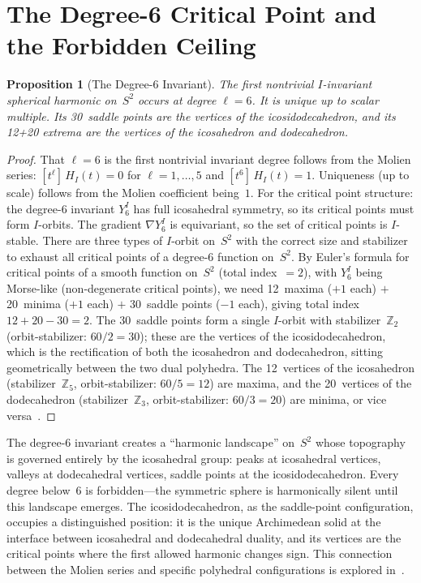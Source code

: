 \documentclass[11pt,letterpaper]{article}
\newtheorem{proposition}[theorem]{Proposition}
\theoremstyle{definition}
\newcommand{\ZZ}{\mathbb{Z}}
\begin{document}
\section{The Degree-6 Critical Point and the Forbidden Ceiling}\label{sec:critical}
\begin{proposition}[The Degree-6 Invariant]\label{prop:deg6}
The first nontrivial $I$-invariant spherical harmonic on~$S^2$ occurs at degree $\ell=6$.  It is unique up to scalar multiple.  Its 30~saddle points are the vertices of the icosidodecahedron, and its 12+20 extrema are the vertices of the icosahedron and dodecahedron.
\end{proposition}
\begin{proof}
That $\ell=6$ is the first nontrivial invariant degree follows from the Molien series: $[t^\ell]\,H_I(t)=0$ for $\ell=1,\dots,5$ and $[t^6]\,H_I(t)=1$.  Uniqueness (up to scale) follows from the Molien coefficient being~$1$.
For the critical point structure: the degree-6 invariant $Y_6^I$ has full icosahedral symmetry, so its critical points must form $I$-orbits.  The gradient $\nabla Y_6^I$ is equivariant, so the set of critical points is $I$-stable.  There are three types of $I$-orbit on~$S^2$ with the correct size and stabilizer to exhaust all critical points of a degree-6 function on~$S^2$.  By Euler's formula for critical points of a smooth function on~$S^2$ (total index~$= 2$), with $Y_6^I$ being Morse-like (non-degenerate critical points), we need 12~maxima ($+1$ each) $+$ 20~minima ($+1$ each) $+$ 30~saddle points ($-1$ each), giving total index $12+20-30=2$.\checkmark
The 30~saddle points form a single $I$-orbit with stabilizer~$\ZZ_2$ (orbit-stabilizer: $60/2=30$); these are the vertices of the icosidodecahedron, which is the rectification of both the icosahedron and dodecahedron, sitting geometrically between the two dual polyhedra.  The 12~vertices of the icosahedron (stabilizer~$\ZZ_5$, orbit-stabilizer: $60/5=12$) are maxima, and the 20~vertices of the dodecahedron (stabilizer~$\ZZ_3$, orbit-stabilizer: $60/3=20$) are minima, or vice versa~\cite{Poole1932}.
\end{proof}
\begin{remarkbox}
The degree-6 invariant creates a ``harmonic landscape'' on~$S^2$ whose topography is governed entirely by the icosahedral group: peaks at icosahedral vertices, valleys at dodecahedral vertices, saddle points at the icosidodecahedron.  Every degree below~6 is forbidden---the symmetric sphere is harmonically silent until this landscape emerges.  The icosidodecahedron, as the saddle-point configuration, occupies a distinguished position: it is the unique Archimedean solid at the interface between icosahedral and dodecahedral duality, and its vertices are the critical points where the first allowed harmonic changes sign.  This connection between the Molien series and specific polyhedral configurations is explored in~\cite{Meucci2026loop}.
\end{remarkbox}
\end{document}
